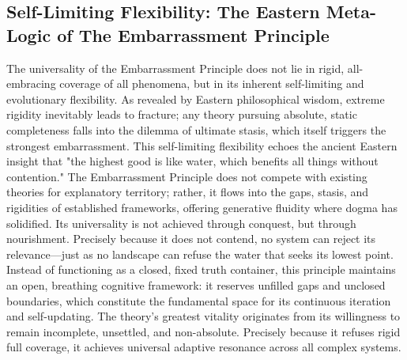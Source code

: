 \documentclass[10pt,a4paper]{article}
\begin{document}
\subsection*{Self-Limiting Flexibility: The Eastern Meta-Logic of The Embarrassment Principle}
The universality of the Embarrassment Principle does not lie in rigid, all-embracing coverage of all phenomena, but in its inherent self-limiting and evolutionary flexibility. As revealed by Eastern philosophical wisdom, extreme rigidity inevitably leads to fracture; any theory pursuing absolute, static completeness falls into the dilemma of ultimate stasis, which itself triggers the strongest embarrassment. This self-limiting flexibility echoes the ancient Eastern insight that "the highest good is like water, which benefits all things without contention." The Embarrassment Principle does not compete with existing theories for explanatory territory; rather, it flows into the gaps, stasis, and rigidities of established frameworks, offering generative fluidity where dogma has solidified. Its universality is not achieved through conquest, but through nourishment. Precisely because it does not contend, no system can reject its relevance—just as no landscape can refuse the water that seeks its lowest point. Instead of functioning as a closed, fixed truth container, this principle maintains an open, breathing cognitive framework: it reserves unfilled gaps and unclosed boundaries, which constitute the fundamental space for its continuous iteration and self-updating. The theory’s greatest vitality originates from its willingness to remain incomplete, unsettled, and non-absolute. Precisely because it refuses rigid full coverage, it achieves universal adaptive resonance across all complex systems.
\end{document}
